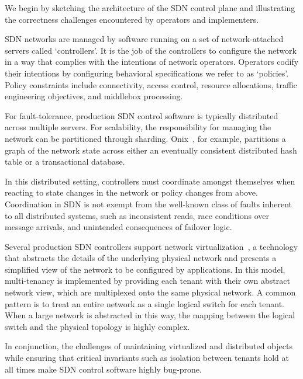 We begin by sketching the architecture of the SDN control plane and
illustrating the correctness challenges encountered by operators and
implementers.

SDN networks are managed by software running on a set of network-attached
servers called `controllers'. It is the job of the controllers to configure
the network in a way that complies with the intentions of network
operators. Operators codify their intentions by configuring
behavioral specifications we refer to as `policies'. Policy constraints
include connectivity, access control,
resource allocations, traffic engineering objectives, and middlebox
processing.

For fault-tolerance, production SDN control software is typically
distributed across multiple servers. For scalability, the responsibility for
managing the network can be partitioned through sharding.
Onix~\cite{onix}, for example, partitions a
graph of the network state across either an eventually consistent
distributed hash table or a
transactional database.

In this distributed setting, controllers must coordinate amongst themselves
when reacting to state changes in the network or
policy changes from above.
Coordination in SDN is not exempt from the well-known class of faults
inherent to all distributed systems, such as
inconsistent reads, race conditions over message arrivals, and
unintended consequences of failover logic.

Several production SDN controllers support network
virtualization~\cite{bigswitch,nicirahomepage,contextream}, a technology that
abstracts the details of the underlying physical network and presents a
simplified view of the network to be configured by applications.
In this model, multi-tenancy is implemented by providing each tenant with their
own abstract network view, which are multiplexed onto the same physical network.
A common pattern is to treat an entire network as a single logical switch for each
tenant. When a large network is
abstracted in this way, the mapping between
the logical switch and the physical topology is highly complex.

In conjunction, the challenges of maintaining virtualized and distributed
objects while ensuring that critical invariants such as isolation between
tenants hold at all times make
SDN control software highly bug-prone.


